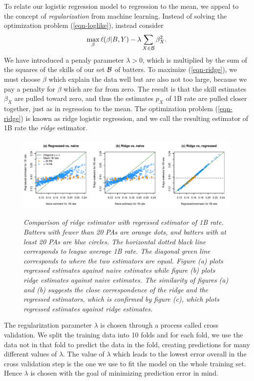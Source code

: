 \documentclass[11pt]{article}
\begin{document}
To relate our logistic regression model to regression to the mean, we appeal to
the concept of {\it regularization} from machine learning. Instead of solving
the optimization problem (\ref{eqn-loglike}), instead consider
\begin{equation}
\label{eqn-ridge}
\max_{\beta}\ell(\beta|B, Y) - \lambda\sum_{X \in \mathcal B}\beta_{X}^2.
\end{equation}
We have introduced a penaly parameter $\lambda > 0$, which is multiplied by
the sum of the squares of the skills of our set $\mathcal B$ of batters. To maximize
(\ref{eqn-ridge}), we must choose $\beta$ which explain the data well but are
also not too large, because we pay a penalty for $\beta$ which are far from
zero. The result is that the skill estimates $\beta_X$ are pulled toward zero,
and thus the estimates $p_X$ of 1B rate are pulled closer together, just as in
regression to the mean. The optimization problem (\ref{eqn-ridge}) is known as
ridge logistic regression, and we call the resulting estimator of 1B rate the
{\it ridge} estimator.

\begin{figure}[h]
\caption{\it Comparison of ridge estimator with regressed estimator of 1B rate.
    Batters with fewer than 20 PAs are orange dots, and batters with at least 20
    PAs are blue circles. The horizontal dotted black line corresponds to league
    average 1B rate. The diagonal green line corresponds to where the two
    estimators are equal. Figure (a) plots regressed estimates against naive
    estimates while figure (b) plots ridge estimates against naive estimates.
    The similarity of figures (a) and (b) suggests the close correspondence of
    the ridge and the regressed estimators, which is confirmed by figure (c),
    which plots regressed estimates against ridge estimates.}
\hspace{-1cm}
\includegraphics[width = 1.1\textwidth]{../figs/regul-as-regre.pdf}
\label{fig-regul-as-regre}
\end{figure}

The regularization parameter $\lambda$ is chosen through a process called cross
validation. We split the training data into 10 folds and for each fold, we use
the data not in that fold to predict the data in the fold, creating predictions
for many different values of $\lambda$. The value of $\lambda$ which leads to
the lowest error overall in the cross validation step is the one we use to fit
the model on the whole training set. Hence $\lambda$ is chosen with the goal of
minimizing prediction error in mind.
\end{document}
